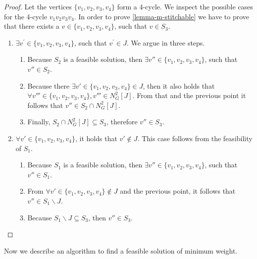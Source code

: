 \begin{proof}

Let the vertices $\{v_1,v_2,v_3,v_4\}$ form a 4-cycle.
We inspect the possible cases for the 4-cycle $v_1 v_2 v_3 v_4$. In order 
to prove \ref{lemma-m-stitchable} we have to prove that there exists a $v \in \{v_1, v_2, v_3, v_4\}$,
such that $v \in S_3$. 

\begin{enumerate}[label=\textbf{•}]
    \item $\exists v^{\prime} \in \{v_1,v_2,v_3,v_4\}$, such that $v^{\prime} \in J$. We argue in three steps.

    \begin{enumerate}
        \item Because $S_2$ is a feasible solution, then $\exists v'' \in \{v_1, v_2, v_3, v_4\}$,
        such that $v'' \in S_2$.
        \item Because there $\exists v' \in \{v_1,v_2,v_3,v_4\} \in J$, then it also holds
        that $\forall  v''' \in \{v_1,v_2,v_3,v_4\}, v''' \in N^{2}_{G}[J]$. From that and the previous 
        point it follows that $v'' \in S_2 \cap N^{2}_{G}[J]$.
        \item Finally, $S_2 \cap N^{2}_{G}[J] \subseteq S_3$, therefore $v'' \in S_3$.
    \end{enumerate}

    \item $\forall v' \in \{v_1,v_2,v_3,v_4\}$, it holds that $v' \notin J$.
    This case follows from the feasibility of $S_1$.

    \begin{enumerate}
        \item Because $S_1$ is a feasible solution, then $\exists v'' \in \{v_1,v_2,v_3,v_4\}$,
        such that $v'' \in S_1$.
        \item From $\forall v' \in \{v_1,v_2,v_3,v_4\} \notin J$ and the previous point, it follows 
        that $v'' \in S_1 \backslash J$.
        \item Because $S_1 \backslash J \subseteq S_3$, then $v'' \in S_3$.
    \end{enumerate}

\end{enumerate}

\end{proof}

 Now we describe an algorithm to find a feasible solution of minimum weight.

